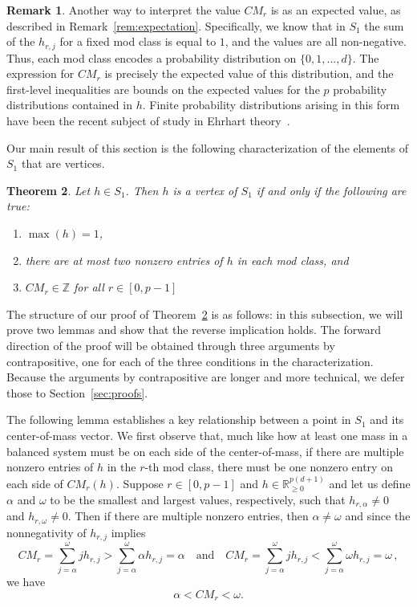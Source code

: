 \documentclass[12pt]{amsart}
\newtheorem{thm}{Theorem}[section]
\theoremstyle{definition}
\newtheorem{remark}[thm]{Remark}
\numberwithin{equation}{section}
\renewcommand\>{\rangle}
\newcommand\<{\langle}
\newcommand\0{\mathbf{0}}
\newcommand\RR{\mathbb{R}}
\newcommand\ZZ{\mathbb{Z}}
\begin{document}
\begin{remark}\label{rem:cmprobability}
Another way to interpret the value $CM_r$ is as an expected value, as described in Remark~\ref{rem:expectation}.
Specifically, we know that in $S_1$ the sum of the $h_{r,j}$ for a fixed mod class is equal to $1$, and the values are all non-negative. 
Thus, each mod class encodes a probability distribution on $\{0,1,\ldots,d\}$. 
The expression for $CM_r$ is precisely the expected value of this distribution, and the first-level inequalities are bounds on the expected values for the $p$ probability distributions contained in $h$.
Finite probability distributions arising in this form have been the recent subject of study in Ehrhart theory~\cite{ehrhartdistributions}.
\end{remark}

Our main result of this section is the following characterization of the elements of $S_1$ that are vertices.

\begin{thm}\label{t:S1_vertex}
	Let $h \in S_1$. Then $h$ is a vertex of $S_1$ if and only if the following are true:
	\begin{enumerate}
		\item[(1)] $\max(h) = 1$,
		\item[(2)] there are at most two nonzero entries of $h$ in each mod class, and
		\item[(3)] $CM_r \in \ZZ$ for all $r \in [0,p-1]$
	\end{enumerate}
\end{thm}

The structure of our proof of Theorem~\ref{t:S1_vertex} is as follows: in this subsection, we will prove two lemmas and show that the reverse implication holds.
The forward direction of the proof will be obtained through three arguments by contrapositive, one for each of the three conditions in the characterization.
Because the arguments by contrapositive are longer and more technical, we defer those to Section~\ref{sec:proofs}.

The following lemma establishes a key relationship between a point in $S_1$ and its center-of-mass vector.
We first observe that, much like how at least one mass in a balanced system must be on each side of the center-of-mass, if there are multiple nonzero entries of $h$ in the $r$-th mod class, there must be one nonzero entry on each side of $CM_r(h)$. 
Suppose $r \in [0,p-1]$ and $h \in \RR^{p(d+1)}_{\geq 0}$ and let us define $\alpha$ and $\omega$ to be the smallest and largest values, respectively, such that $h_{r,\alpha} \neq 0$ and $h_{r,\omega} \neq 0$. 
Then if there are multiple nonzero entries, then $\alpha \neq \omega$ and since the nonnegativity of $h_{r,j}$ implies
\[CM_r = \sum_{j = \alpha}^\omega j h_{r,j} > \sum_{j= \alpha}^\omega \alpha h_{r,j} = \alpha 
\quad \text{and} \quad
CM_r = \sum_{j = \alpha}^\omega j h_{r,j} < \sum_{j= \alpha}^\omega \omega h_{r,j} = \omega \, ,
\]
we have
\begin{equation}\label{eq:CM_balance}
	\alpha < CM_r < \omega.
\end{equation}
\end{document}
